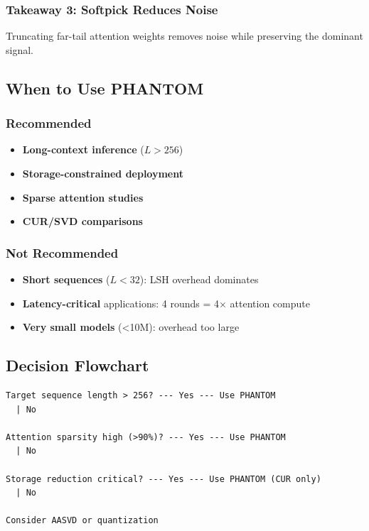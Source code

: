 \subsubsection{Takeaway 3: Softpick Reduces Noise}

Truncating far-tail attention weights removes noise while preserving the 
dominant signal.

\subsection{When to Use PHANTOM}

\subsubsection{Recommended}

\begin{itemize}
\item \textbf{Long-context inference} ($L > 256$)
\item \textbf{Storage-constrained deployment}
\item \textbf{Sparse attention studies}
\item \textbf{CUR/SVD comparisons}

\end{itemize}
\subsubsection{Not Recommended}

\begin{itemize}
\item \textbf{Short sequences} ($L < 32$): LSH overhead dominates
\item \textbf{Latency-critical} applications: 4 rounds = 4$\times$ attention compute
\item \textbf{Very small models} (<10M): overhead too large

\end{itemize}
\subsection{Decision Flowchart}

\begin{lstlisting}
Target sequence length > 256? --- Yes --- Use PHANTOM
  | No
   
Attention sparsity high (>90%)? --- Yes --- Use PHANTOM
  | No
   
Storage reduction critical? --- Yes --- Use PHANTOM (CUR only)
  | No
   
Consider AASVD or quantization
\end{lstlisting}

